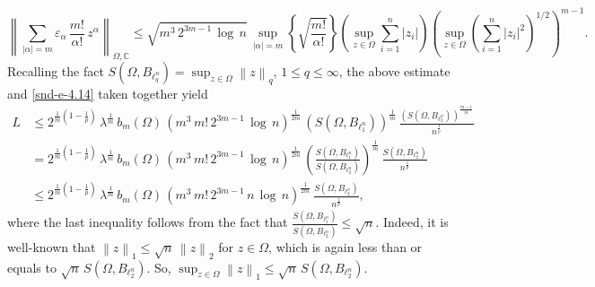 \documentclass[a4paper,11pt, reqno]{amsart}
\theoremstyle{definition}
\newcounter {own}
\newcommand{\norm}[1]{\left\lVert#1\right\rVert}
\begin{document}
	\begin{equation*}
		\norm{\sum_{|\alpha|=m} \varepsilon_{\alpha}\,\frac{m!}{\alpha!}\, z^{\alpha} }_{\Omega,\mathbb{C}} \leq \sqrt{m^3\, 2^{3m-1}\, \log\,n}\, \sup _{|\alpha|=m}\left\{\sqrt{\frac{m!}{\alpha!}}\right\} \left(\sup_{z \in \Omega}\sum_{i=1}^{n} |z_i|\right) \left(\sup_{z \in \Omega}\left(\sum_{i=1}^{n} |z_i|^2\right)^{1/2}\right)^{m-1}.
	\end{equation*}
	Recalling the fact $S(\Omega,B_{\ell^n_q})=\sup_{z \in \Omega} \norm{z}_{q}$, $1 \leq q \leq \infty$, the above estimate and \eqref{snd-e-4.14} taken together yield
	\begin{align} \label{snd-e-4.15}
		L & \leq 2^{\frac{1}{m}\left(1-\frac{1}{p}\right)}\,\lambda^{\frac{1}{m}}\,b_m(\Omega)\, \left(m^3\,m!\, 2^{3m-1}\, \log\,n\right)^{\frac{1}{2m}}\, (S(\Omega,B_{\ell^n_1}))^{\frac{1}{m}}\, \frac{(S(\Omega,B_{\ell^n_2}))^{\frac{m-1}{m}}}{n^{\frac{1}{p}}} \nonumber\\[2mm]
		& = 2^{\frac{1}{m}\left(1-\frac{1}{p}\right)}\,\lambda^{\frac{1}{m}}\,b_m(\Omega)\, \left(m^3\,m!\, 2^{3m-1}\, \log\,n\right)^{\frac{1}{2m}}\, \left(\frac{S(\Omega,B_{\ell^n_1})}{S(\Omega,B_{\ell^n_2})}\right)^{\frac{1}{m}}\, \frac{S(\Omega,B_{\ell^n_2})}{n^{\frac{1}{p}}} \nonumber\\[2mm]
		& \leq 2^{\frac{1}{m}\left(1-\frac{1}{p}\right)}\,\lambda^{\frac{1}{m}}\,b_m(\Omega)\, \left(m^3\,m!\, 2^{3m-1}\,n\, \log\,n\right)^{\frac{1}{2m}}\,\frac{S(\Omega,B_{\ell^n_2})}{n^{\frac{1}{p}}}, 
	\end{align}
	where the last inequality follows from the fact that $\frac{S(\Omega,B_{\ell^n_1})}{S(\Omega,B_{\ell^n_2})} \leq \sqrt{n}$. Indeed, it is well-known that $\norm{z}_1 \leq \sqrt{n}\, \norm{z}_2 $ for $z \in \Omega$, which is again less than or equals to $\sqrt{n}\, S(\Omega,B_{\ell^n_2})$. So, $\sup_{z \in \Omega} \norm{z}_1 \leq \sqrt{n}\, S(\Omega,B_{\ell^n_2})$.
	\vspace{1mm}
	
\end{document}
